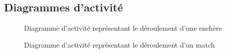\documentclass[a4paper]{report}
\begin{document}
\subsection{Diagrammes d'activité}

\begin{figure}[h]
    \caption{\label{3} Diagramme d'activité représentant le déroulement d'une enchère}
\end{figure}

\begin{figure}[h]
    \caption{\label{3} Diagramme d'activité représentant le déroulement d'un match}
\end{figure}
\end{document}
